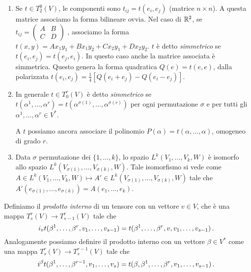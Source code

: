 \begin{example}
\begin{enumerate}
	\item Se $t\in T_2^0(V)$, le componenti sono $t_{ij} = t(e_i,e_j)$ (matrice $n\times n$). A questa matrice associamo la forma bilineare ovvia.
	Nel caso di $\mathbb R^2$, se $t_{ij} = \left(\begin{matrix}
	                                  A & B \\
	                                  C & D 
	                                 \end{matrix}\right)$
	, associamo la forma $t(x,y) = Ax_1y_1+Bx_1y_2+Cx_2y_1+Dx_2y_2$.
	$t$ è detto \emph{simmetrico} se $t(e_i,e_j) =t(e_j,e_i)$. In questo caso anche la matrice associata è simmetrica. Questo genera la forma quadratica $Q(e) = t(e,e)$, dalla polarizzata $t(e_i,e_j) = \frac 14 [Q(e_i+e_j)-Q(e_i-e_j)]$.
	\item In generale $t\in T_0^r(V)$ è detto \emph{simmetrico} se $t(\alpha^1,\dots,\alpha^r) = t(\alpha^{\sigma(1)},\dots,\alpha^{\sigma(r)})$ per ogni permutazione $\sigma$ e per tutti gli $\alpha^1,\dots,\alpha^r \in V^*$.
	
	A $t$ possiamo ancora associare il polinomio $P(\alpha) = t(\alpha,\dots,\alpha)$, omogeneo di grado $r$.
	\item Data $\sigma$ permutazione dei $\{1,\dots,k\}$, lo spazio $L^k(V_1,\dots,V_k,W)$ è isomorfo allo spazio $L^k(V_{\sigma(1)},\dots,V_{\sigma(k)},W)$.
	Tale isomorfismo si vede come $A \in L^k(V_1,\dots,V_k,W) \mapsto A'\in L^k(V_{\sigma(1)},\dots,V_{\sigma(k)},W)$ tale che $A'(e_{\sigma(1)},\dots,e_{\sigma(k)}) = A(e_1,\dots,e_k)$.
\end{enumerate}
\end{example}

\begin{definition} 
	Definiamo il \emph{prodotto interno} di un tensore con un vettore $v\in V$, che è una mappa $T_s^r(V)\to T_{s-1}^r(V)$ tale che
	\begin{equation*}
		i_vt(\beta^1,\dots,\beta^r,v_1,\dots,v_{s-1}) = t(\beta^1,\dots,\beta^r,v,v_1,\dots,v_{s-1})\, \text{. }
	\end{equation*}
	Analogamente possiamo definire il prodotto interno con un vettore $\beta \in V^*$ come una mappa $T_s^r(V)\to T_{s}^{r-1}(V)$ tale che
	\begin{equation*}
		i^\beta t(\beta^1,\dots,\beta^{r-1},v_1,\dots,v_s) = t(\beta,\beta^1,\dots,\beta^r,v_1,\dots,v_{s-1})\, \text{. }
	\end{equation*}
\end{definition}

